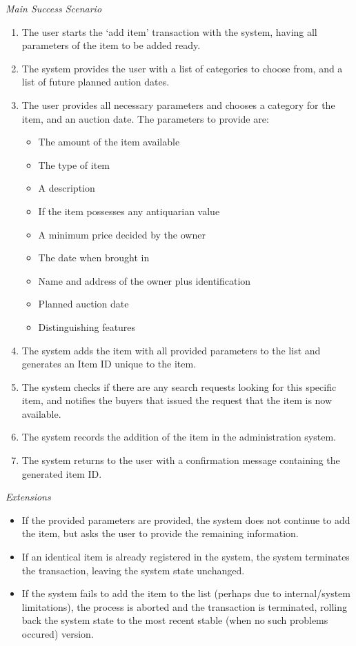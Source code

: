 \textsl{Main Success Scenario}
\begin{enumerate}[noitemsep]
	\item The user starts the `add item' transaction with the system, having all parameters of the item to be added ready.
	\item The system provides the user with a list of categories to choose from, and a list of future planned aution dates.
	\item The user provides all necessary parameters and chooses a category for the item, and an auction date. The parameters to provide are:
	\begin{itemize}[noitemsep]
		\item The amount of the item available
		\item The type of item
		\item A description
		\item If the item possesses any antiquarian value
		\item A minimum price decided by the owner
		\item The date when brought in
		\item Name and address of the owner plus identification
		\item Planned auction date
		\item Distinguishing features
	\end{itemize}
	\item The system adds the item with all provided parameters to the list and generates an Item ID unique to the item.
	\item The system checks if there are any search requests looking for this specific item, and notifies the buyers that issued the request that the item is now available.
	\item The system records the addition of the item in the administration system.
	\item The system returns to the user with a confirmation message containing the generated item ID.
\end{enumerate}
\textsl{Extensions}
\begin{itemize}[noitemsep]
	\item If the provided parameters are provided, the system does not continue to add the item, but asks the user to provide the remaining information.
	\item If an identical item is already registered in the system, the system terminates the transaction, leaving the system state unchanged.
	\item If the system fails to add the item to the list (perhaps due to internal/system limitations), the process is aborted and the transaction is terminated, rolling back the system state to the most recent stable (when no such problems occured) version.
\end{itemize}
